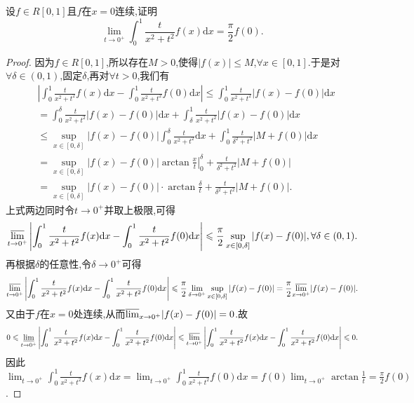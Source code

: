 \documentclass[../../main.tex]{subfiles}%
\begin{document}
\begin{example}[$\,\,$Possion核]\label{example:Possion核}
设\(f\in R[0,1]\)且\(f\)在\(x = 0\)连续,证明
\[
\lim_{t\rightarrow 0^+} \int_0^1{\frac{t}{x^2+t^2}f(x)\mathrm{d}x}=\frac{\pi}{2}f(0).
\]
\end{example}
\begin{proof}

因为\(f\in R[0,1]\),所以存在\(M > 0\),使得\(\vert f(x)\vert\leqslant M\),\(\forall x\in [0,1]\).于是对\(\forall\delta\in(0,1)\),固定\(\delta\),再对\(\forall t > 0\),我们有
\begin{align*}
&\left|\int_0^1\frac{t}{x^2 + t^2}f(x)\mathrm{d}x - \int_0^1\frac{t}{x^2 + t^2}f(0)\mathrm{d}x\right| \leqslant \int_0^1\frac{t}{x^2 + t^2}\vert f(x) - f(0)\vert \mathrm{d}x\\
&= \int_0^{\delta}\frac{t}{x^2 + t^2}\vert f(x) - f(0)\vert \mathrm{d}x + \int_{\delta}^1\frac{t}{x^2 + t^2}\vert f(x) - f(0)\vert \mathrm{d}x\\
&\leqslant \sup_{x\in[0,\delta]}\vert f(x) - f(0)\vert\int_0^{\delta}\frac{t}{x^2 + t^2}\mathrm{d}x + \int_0^1\frac{t}{\delta^2 + t^2}\vert M + f(0)\vert \mathrm{d}x\\
&= \sup_{x\in[0,\delta]}\vert f(x) - f(0)\vert\left.\arctan\frac{x}{t}\right|_{0}^{\delta} + \frac{t}{\delta^2 + t^2}\vert M + f(0)\vert\\
&= \sup_{x\in[0,\delta]}\vert f(x) - f(0)\vert\cdot\arctan\frac{\delta}{t} + \frac{t}{\delta^2 + t^2}\vert M + f(0)\vert.
\end{align*}
上式两边同时令\(t\rightarrow 0^+\)并取上极限,可得
\[
{\varlimsup_{t\rightarrow 0^+}}\left|\int_0^1\frac{t}{x^2 + t^2}f(x)\mathrm{d}x - \int_0^1\frac{t}{x^2 + t^2}f(0)\mathrm{d}x\right| \leqslant \frac{\pi}{2}\sup_{x\in[0,\delta]}\vert f(x) - f(0)\vert, \forall\delta\in(0,1).
\]
再根据\(\delta\)的任意性,令\(\delta\rightarrow 0^+\)可得
\[
{\varlimsup_{t\rightarrow 0^+}}\left|\int_0^1\frac{t}{x^2 + t^2}f(x)\mathrm{d}x - \int_0^1\frac{t}{x^2 + t^2}f(0)\mathrm{d}x\right| \leqslant \frac{\pi}{2}\lim_{\delta\rightarrow 0^+}\sup_{x\in[0,\delta]}\vert f(x) - f(0)\vert = \frac{\pi}{2}{\varlimsup_{x\rightarrow 0^+}}\vert f(x) - f(0)\vert.
\]
又由于\(f\)在\(x = 0\)处连续,从而\({\varlimsup_{x\rightarrow 0^+}}\vert f(x) - f(0)\vert = 0\).故
\[
0\leqslant \underset{t\rightarrow 0^+}{{\varliminf }}\left| \int_0^1{\frac{t}{x^2+t^2}f(x)\mathrm{d}x}-\int_0^1{\frac{t}{x^2+t^2}f(0)\mathrm{d}x} \right|\leqslant {\varlimsup_{t\rightarrow 0^+} }\left| \int_0^1{\frac{t}{x^2+t^2}f(x)\mathrm{d}x}-\int_0^1{\frac{t}{x^2+t^2}f(0)\mathrm{d}x} \right|\leqslant 0.
\]
因此\(\lim_{t\rightarrow 0^+}\int_0^1\frac{t}{x^2 + t^2}f(x)\mathrm{d}x = \lim_{t\rightarrow 0^+}\int_0^1\frac{t}{x^2 + t^2}f(0)\mathrm{d}x = f(0)\lim_{t\rightarrow 0^+}\arctan\frac{1}{t} = \frac{\pi}{2}f(0)\).

\end{proof}
\end{document}

